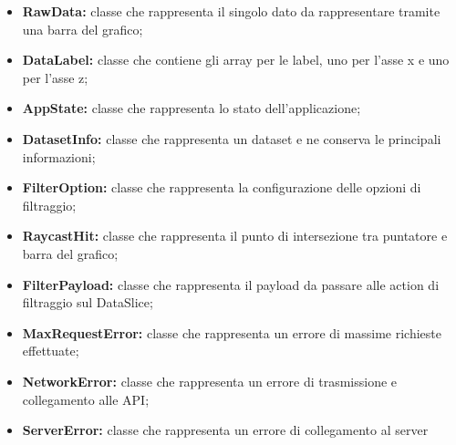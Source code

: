         \begin{itemize}
            \item \textbf{RawData:} classe che rappresenta il singolo dato da rappresentare tramite una barra del grafico;
            \item \textbf{DataLabel:} classe che contiene gli array per le label, uno per l'asse x e uno per l'asse z;
            \item \textbf{AppState:} classe che rappresenta lo stato dell'applicazione;
            \item \textbf{DatasetInfo:} classe che rappresenta un dataset e ne conserva le principali informazioni;
            \item \textbf{FilterOption:} classe che rappresenta la configurazione delle opzioni di filtraggio;
            \item \textbf{RaycastHit:} classe che rappresenta il punto di intersezione tra puntatore e barra del grafico;
            \item \textbf{FilterPayload:} classe che rappresenta il payload da passare alle action di filtraggio sul DataSlice;
            \item \textbf{MaxRequestError:} classe che rappresenta un errore di massime richieste effettuate;
            \item \textbf{NetworkError:} classe che rappresenta un errore di trasmissione e collegamento alle API;
            \item \textbf{ServerError:} classe che rappresenta un errore di collegamento al server
        \end{itemize}
